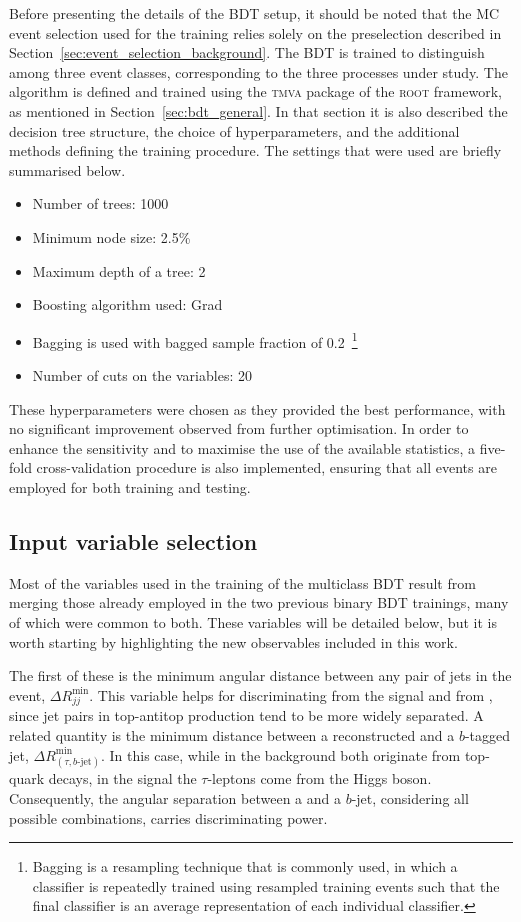 Before presenting the details of the BDT setup, it should be noted that the MC event selection used for the training relies solely on the preselection described in Section~\ref{sec:event_selection_background}. The BDT is trained to distinguish among three event classes, corresponding to the three processes under study. The algorithm is defined and trained using the \textsc{tmva} package of the \textsc{root} framework, as mentioned in Section~\ref{sec:bdt_general}. In that section it is also described the decision tree structure, the choice of hyperparameters, and the additional methods defining the training procedure. The settings that were used are briefly summarised below.
\begin{itemize}
    \small
    \item Number of trees: 1000
    \item Minimum node size: 2.5\%
    \item Maximum depth of a tree: 2
    \item Boosting algorithm used: Grad
    \item Bagging is used with bagged sample fraction of 0.2~\footnote{Bagging is a resampling technique that is commonly used, in which a classifier is repeatedly trained using resampled training
    events such that the final classifier is an average representation of each individual classifier.}
    \item Number of cuts on the variables: 20
\end{itemize}
These hyperparameters were chosen as they provided the best performance, with no significant improvement observed from further optimisation. In order to enhance the sensitivity and to maximise the use of the available statistics, a five-fold cross-validation procedure is also implemented, ensuring that all events are employed for both training and testing.

\subsection{Input variable selection}

Most of the variables used in the training of the multiclass BDT result from merging those already employed in the two previous binary BDT trainings, many of which were common to both. These variables will be detailed below, but it is worth starting by highlighting the new observables included in this work.

The first of these is the minimum angular distance between any pair of jets in the event, $\Delta R^{\text{min}}_{jj}$. This variable helps for discriminating \ttbar from the signal and from \ztautau, since jet pairs in top-antitop production tend to be more widely separated. A related quantity is the minimum distance between a reconstructed \tauhad and a $b$-tagged jet, $\Delta R^{\text{min}}_{(\tau,b\text{-jet})}$. In this case, while in the \ttbar background both \tauhad originate from top-quark decays, in the \ttH signal the $\tau$-leptons come from the Higgs boson. Consequently, the angular separation between a \tauhad and a $b$-jet, considering all possible combinations, carries discriminating power. 

